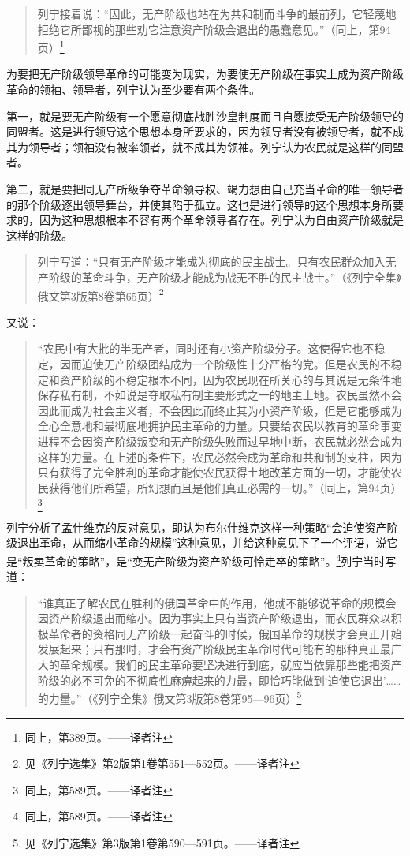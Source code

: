 \begin{quotation}
列宁接着说：“因此，无产阶级也站在为共和制而斗争的最前列，它轻蔑地拒绝它所鄙视的那些劝它注意资产阶级会退出的愚蠢意见。”（同上，第94页）\footnote{同上，第389页。——译者注}
\end{quotation}

为要把无产阶级领导革命的可能变为现实，为要使无产阶级在事实上成为资产阶级革命的领袖、领导者，列宁认为至少要有两个条件。

第一，就是要无产阶级有一个愿意彻底战胜沙皇制度而且自愿接受无产阶级领导的同盟者。这是进行领导这个思想本身所要求的，因为领导者没有被领导者，就不成其为领导者；领袖没有被率领者，就不成其为领袖。列宁认为农民就是这样的同盟者。

第二，就是要把同无产所级争夺革命领导权、竭力想由自己充当革命的唯一领导者的那个阶级逐出领导舞台，并使其陷于孤立。这也是进行领导的这个思想本身所要求的，因为这种思想根本不容有两个革命领导者存在。列宁认为自由资产阶级就是这样的阶级。

\begin{quotation}
列宁写道：“只有无产阶级才能成为彻底的民主战士。只有农民群众加入无产阶级的革命斗争，无产阶级才能成为战无不胜的民主战士。”（《列宁全集》俄文第3版第8卷第65页）\footnote{见《列宁选集》第2版第1卷第551—552页。——译者注}
\end{quotation}

又说：

\begin{quotation}
“农民中有大批的半无产者，同时还有小资产阶级分子。这使得它也不稳定，因而迫使无产阶级团结成为一个阶级性十分严格的党。但是农民的不稳定和资产阶级的不稳定根本不同，因为农民现在所关心的与其说是无条件地保存私有制，不如说是夺取私有制主要形式之一的地主土地。农民虽然不会因此而成为社会主义者，不会因此而终止其为小资产阶级，但是它能够成为全心全意地和最彻底地拥护民主革命的力量。只要给农民以教育的革命事变进程不会因资产阶级叛变和无产阶级失败而过早地中断，农民就必然会成为这样的力量。在上述的条件下，农民必然会成为革命和共和制的支柱，因为只有获得了完全胜利的革命才能使农民获得土地改革方面的一切，才能使农民获得他们所希望，所幻想而且是他们真正必需的一切。”（同上，第94页）\footnote{同上，第589页。——译者注}
\end{quotation}

列宁分析了孟什维克的反对意见，即认为布尔什维克这样一种策略“会迫使资产阶级退出革命，从而缩小革命的规模”这种意见，并给这种意见下了一个评语，说它是“叛卖革命的策略”，是“变无产阶级为资产阶级可怜走卒的策略”。\footnote{同上，第589页。——译者注}列宁当时写道：

\begin{quotation}
“谁真正了解农民在胜利的俄国革命中的作用，他就不能够说革命的规模会因资产阶级退出而缩小。因为事实上只有当资产阶级退出，而农民群众以积极革命者的资格同无产阶级一起奋斗的时候，俄国革命的规模才会真正开始发展起来；只有那时，才会有资产阶级民主革命时代可能有的那种真正最广大的革命规模。我们的民主革命要坚决进行到底，就应当依靠那些能把资产阶级的必不可免的不彻底性麻痹起来的力最，即恰巧能做到‘迫使它退出’……的力量。”（《列宁全集》俄文第3版第8卷第95—96页）\footnote{见《列宁选集》第3版第1卷第590—591页。——译者注}
\end{quotation}

